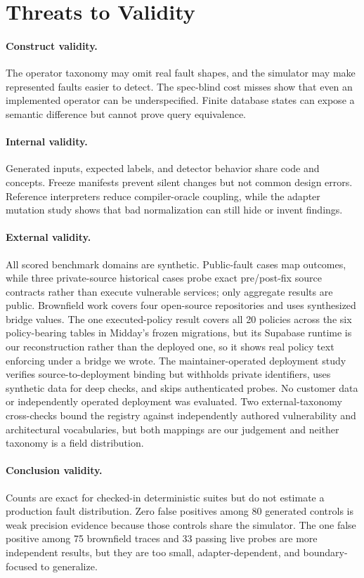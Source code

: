 \section{Threats to Validity}

\paragraph{Construct validity.}
The operator taxonomy may omit real fault shapes, and the simulator may make represented faults easier to detect. The spec-blind cost misses show that even an implemented operator can be underspecified. Finite database states can expose a semantic difference but cannot prove query equivalence.

\paragraph{Internal validity.}
Generated inputs, expected labels, and detector behavior share code and concepts. Freeze manifests prevent silent changes but not common design errors. Reference interpreters reduce compiler-oracle coupling, while the adapter mutation study shows that bad normalization can still hide or invent findings.

\paragraph{External validity.}
All scored benchmark domains are synthetic. Public-fault cases map outcomes, while three private-source historical cases probe exact pre/post-fix source contracts rather than execute vulnerable services; only aggregate results are public. Brownfield work covers four open-source repositories and uses synthesized bridge values. The one executed-policy result covers all 20 policies across the six policy-bearing tables in Midday's frozen migrations, but its Supabase runtime is our reconstruction rather than the deployed one, so it shows real policy text enforcing under a bridge we wrote. The maintainer-operated deployment study verifies source-to-deployment binding but withholds private identifiers, uses synthetic data for deep checks, and skips authenticated probes. No customer data or independently operated deployment was evaluated. Two external-taxonomy cross-checks bound the registry against independently authored vulnerability and architectural vocabularies, but both mappings are our judgement and neither taxonomy is a field distribution.

\paragraph{Conclusion validity.}
Counts are exact for checked-in deterministic suites but do not estimate a production fault distribution. Zero false positives among 80 generated controls is weak precision evidence because those controls share the simulator. The one false positive among 75 brownfield traces and 33 passing live probes are more independent results, but they are too small, adapter-dependent, and boundary-focused to generalize.
